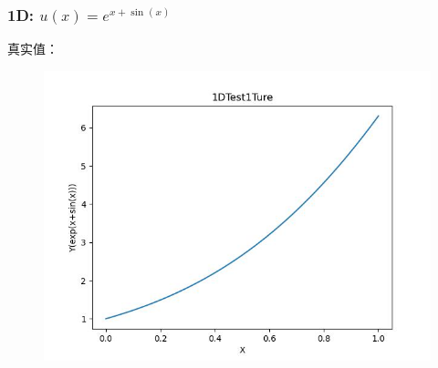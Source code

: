 \documentclass{article}
\begin{document}
\subsubsection{1D: $u(x)=e^{x+\sin(x)}$}
真实值：
\begin{figure}[h]
    \centering
    \includegraphics[width=0.7\linewidth]{1DTest1Ture.jpg}
\end{figure}
\newpage
\end{document}
